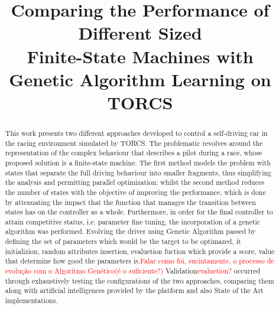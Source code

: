 \documentclass[journal]{IEEEtran}
\newcommand{\toDo}[1]{\textcolor{red}{#1}}
\begin{document}
	\title{Comparing the Performance of Different Sized\\Finite-State Machines with\\
		Genetic Algorithm Learning on TORCS}
	
	\author{
		}
	
	\maketitle
	
	\begin{abstract}
		
		This work presents two different approaches developed to control a self-driving car in the racing environment
		simulated by TORCS. The problematic revolves around the representation of the complex behaviour that
		describes a pilot during a race, whose proposed solution is a finite-state machine. The first method models
		the problem with states that separate the full driving behaviour into smaller fragments, thus simplifying the
		analysis and permitting parallel optimization; whilst the second method reduces the number of states with the
		objective of improving the performance, which is done by attenuating the impact that the function that
		manages the transition between states has on the controller as a whole. Furthermore, in order for the final
		controller to attain competitive status, i.e. parameter fine tuning, the incorporation of a genetic algorithm
		was performed. Evolving the driver using Genetic Algorithm passed by defining the set of parameters 
		which would be the target to be optimazed, it initializion, random attributes insertion, evaluetion fuction 
		which provide a score, value that determine how good the parameters is.\toDo{Falar como foi, sucintamente,
		o processo de evolução com o Algoritmo Genético(é o suficiente?)}
		Validation\toDo{evaluetion?} occurred through exhaustively testing the configurations of the two approaches, comparing them
		along with artificial intelligences provided by the platform and also State of the Art implementations.
				
	\end{abstract}
	
\end{document}
